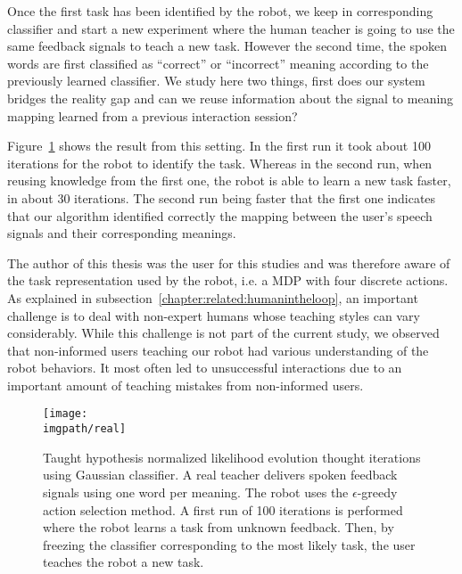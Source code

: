 Once the first task has been identified by the robot, we keep in corresponding classifier and start a new experiment where the human teacher is going to use the same feedback signals to teach a new task. However the second time, the spoken words are first classified as ``correct'' or ``incorrect'' meaning according to the previously learned classifier. We study here two things, first does our system bridges the reality gap and can we reuse information about the signal to meaning mapping learned from a previous interaction session?

Figure~\ref{fig:Real} shows the result from this setting. In the first run it took about 100 iterations for the robot to identify the task. Whereas in the second run, when reusing knowledge from the first one, the robot is able to learn a new task faster, in about 30 iterations. The second run being faster that the first one indicates that our algorithm identified correctly the mapping between the user's speech signals and their corresponding meanings. 

The author of this thesis was the user for this studies and was therefore aware of the task representation used by the robot, i.e. a MDP with four discrete actions. As explained in subsection~\ref{chapter:related:humanintheloop}, an important challenge is to deal with non-expert humans whose teaching styles can vary considerably. While this challenge is not part of the current study, we observed that non-informed users teaching our robot had various understanding of the robot behaviors. It most often led to unsuccessful interactions due to an important amount of teaching mistakes from non-informed users.


\begin{figure}[!htbp]
  \centering
  \texttt{[image: \\imgpath/real]}
  \caption{Taught hypothesis normalized likelihood evolution thought iterations using Gaussian classifier. A real teacher delivers spoken feedback signals using one word per meaning. The robot uses the $\epsilon$-greedy action selection method. A first run of 100 iterations is performed where the robot learns a task from unknown feedback. Then, by freezing the classifier corresponding to the most likely task, the user teaches the robot a new task.}
  \label{fig:Real}
\end{figure}



